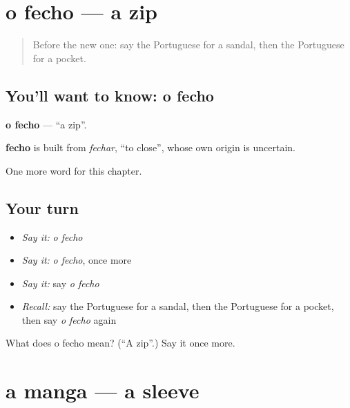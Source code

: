 \section[o fecho]{o fecho — a zip}

\label{lesson:PT-C169-fecho}



\begin{quote}
Before the new one: say the Portuguese for a sandal, then the Portuguese for a pocket.
\end{quote}

\subsection*{You'll want to know: o fecho}
\textbf{o fecho} — \textquotedblleft{}a zip\textquotedblright{}.

\begin{cousinweb}
\textbf{fecho} is built from \emph{fechar}, \textquotedblleft{}to close\textquotedblright{}, whose own origin is uncertain.
\end{cousinweb}

\begin{grammarlens}[title={What you've built}]
One more word for this chapter.
\end{grammarlens}

\subsection*{Your turn}
\begin{itemize}
\raggedright
  \item \emph{Say it:} \emph{o fecho}
  \item \emph{Say it:} \emph{o fecho}, once more
  \item \emph{Say it:} say \emph{o fecho}
  \item \emph{Recall:} say the Portuguese for a sandal, then the Portuguese for a pocket, then say \emph{o fecho} again
\end{itemize}

\begin{tcolorbox}[breakable,colback=teal!4,colframe=teal!35!black,title={Before you move on}]
What does o fecho mean? (\textquotedblleft{}A zip\textquotedblright{}.) Say it once more.
\end{tcolorbox}
\section[a manga]{a manga — a sleeve}

